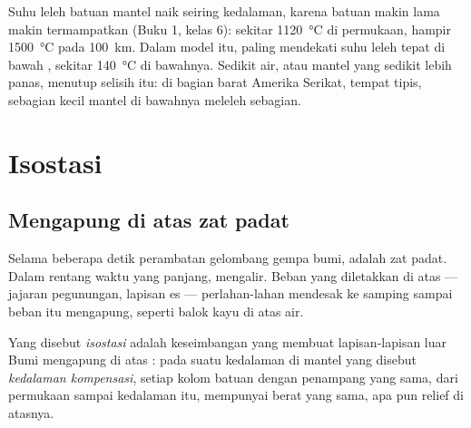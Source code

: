 Suhu leleh batuan mantel naik seiring kedalaman, karena batuan makin lama makin
termampatkan (Buku 1, kelas 6): sekitar \qty{1120}{\celsius} di permukaan,
hampir \qty{1500}{\celsius} pada \qty{100}{km}. Dalam model itu,  paling
mendekati suhu leleh tepat di bawah , sekitar \qty{140}{\celsius} di
bawahnya. Sedikit air, atau mantel yang sedikit lebih panas, menutup selisih
itu: di bagian barat Amerika Serikat, tempat  tipis, sebagian kecil
mantel di bawahnya meleleh sebagian.

\section{Isostasi}

\subsection{Mengapung di atas zat padat}

Selama beberapa detik perambatan gelombang gempa bumi,  adalah zat
padat. Dalam rentang waktu yang panjang,  mengalir. Beban yang
diletakkan di atas  --- jajaran pegunungan, lapisan es --- perlahan-lahan
mendesak  ke samping sampai beban itu mengapung, seperti balok kayu di
atas air.

\begin{definition}\label{def:g11:lithosphere-asthenosphere:isostasy}
Yang disebut \emph{isostasi} adalah keseimbangan yang membuat
lapisan-lapisan luar Bumi mengapung di atas : pada suatu kedalaman di
mantel yang disebut \emph{kedalaman kompensasi},
setiap kolom batuan dengan penampang yang sama, dari permukaan sampai kedalaman
itu, mempunyai berat yang sama, apa pun relief di atasnya.
\end{definition}

